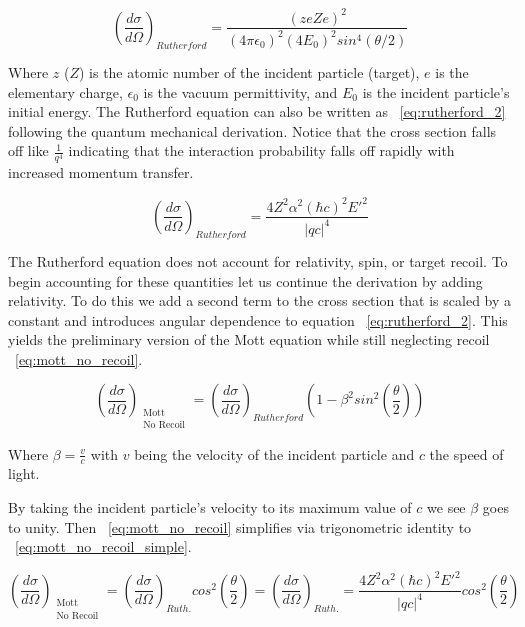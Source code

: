 \begin{equation} \label{eq:rutherford}
	\left(\frac{d\sigma}{d\Omega}\right)_{Rutherford} = \frac{\left(zeZe\right)^2}{(4\pi\epsilon_0)^2(4E_0)^2sin^4(\theta/2)}
\end{equation}

\noindent Where $z$ ($Z$) is the atomic number of the incident particle (target), $e$ is the elementary charge, $\epsilon_0$ is the vacuum permittivity, and $E_0$ is the incident particle's initial energy. The Rutherford equation can also be written as ~\ref{eq:rutherford_2} following the quantum mechanical derivation. Notice that the cross section falls off like $\frac{1}{q^4}$ indicating that the interaction probability falls off rapidly with increased momentum transfer.

\begin{equation} \label{eq:rutherford_2}
	\left(\frac{d\sigma}{d\Omega}\right)_{Rutherford} = \frac{4Z^2\alpha^2\left(\hbar c\right)^2E'^2}{|qc|^4}
\end{equation}

The Rutherford equation does not account for relativity, spin, or target recoil. To begin accounting for these quantities let us continue the derivation by adding relativity. To do this we add a second term to the cross section that is scaled by a constant and introduces angular dependence to equation ~\ref{eq:rutherford_2}. This yields the preliminary version of the Mott equation while still neglecting recoil ~\ref{eq:mott_no_recoil}.

\begin{equation} \label{eq:mott_no_recoil}
	\left(\frac{d\sigma}{d\Omega}\right)_{\substack{ \text{Mott} \\ \text{No Recoil}}} = \left(\frac{d\sigma}{d\Omega}\right)_{Rutherford} \left( 1-\beta^2 sin^2 \left( \frac{\theta}{2} \right) \right)
\end{equation}

\noindent Where $\beta = \frac{v}{c}$ with $v$ being the velocity of the incident particle and $c$ the speed of light. 

By taking the incident particle's velocity to its maximum value of $c$ we see $\beta$ goes to unity. Then ~\ref{eq:mott_no_recoil} simplifies via trigonometric identity to ~\ref{eq:mott_no_recoil_simple}.

\begin{equation} \label{eq:mott_no_recoil_simple}
	\left(\frac{d\sigma}{d\Omega}\right)_{\substack{ \text{Mott} \\ \text{No Recoil}}} = \left(\frac{d\sigma}{d\Omega}\right)_{Ruth.} cos^2 \left( \frac{\theta}{2} \right) = \left(\frac{d\sigma}{d\Omega}\right)_{Ruth.} = \frac{4Z^2\alpha^2\left(\hbar c\right)^2E'^2}{|qc|^4} cos^2 \left( \frac{\theta}{2} \right) 
\end{equation}

